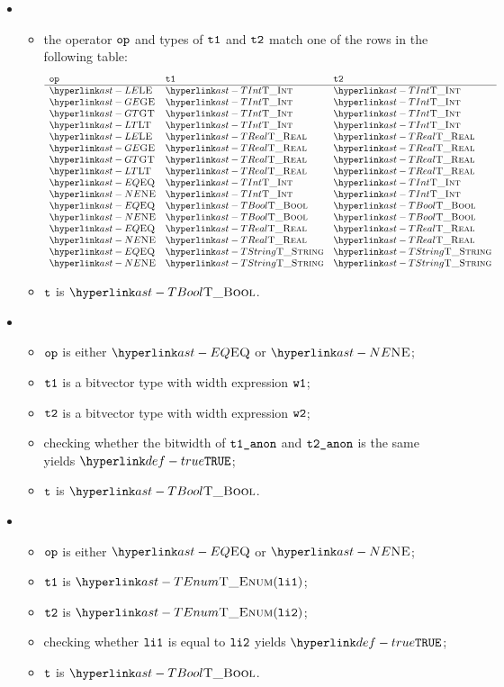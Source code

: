 \begin{itemize}
  \item {}
  \begin{itemize}
    \item the operator $\texttt{op}$ and types of $\texttt{t1}$ and $\texttt{t2}$ match one of the rows in the following table:
    \[
    \begin{array}{lll}
      \mathbf{\op} & \mathbf{\vtone} & \mathbf{\vttwo} \\
      \hline
      \LE  & \TInt    & \TInt\\
      \GE  & \TInt    & \TInt\\
      \GT   & \TInt    & \TInt\\
      \LT   & \TInt    & \TInt\\
      \LE  & \TReal   & \TReal\\
      \GE  & \TReal   & \TReal\\
      \GT   & \TReal   & \TReal\\
      \LT   & \TReal   & \TReal\\
      \EQ & \TInt    & \TInt\\
      \NE  & \TInt    & \TInt\\
      \EQ & \TBool   & \TBool\\
      \NE  & \TBool   & \TBool\\
      \EQ & \TReal   & \TReal\\
      \NE  & \TReal   & \TReal\\
      \EQ & \TString & \TString\\
      \NE  & \TString & \TString
    \end{array}
    \]
    \item $\texttt{t}$ is $\TBool$.
  \end{itemize}

  \item {}
  \begin{itemize}
    \item $\texttt{op}$ is either $\EQ$ or $\NE$;
    \item $\texttt{t1}$ is a bitvector type with width expression $\texttt{w1}$;
    \item $\texttt{t2}$ is a bitvector type with width expression $\texttt{w2}$;
    \item checking whether the bitwidth of $\texttt{t1\_anon}$ and $\texttt{t2\_anon}$ is the same yields $\True$\ProseOrTypeError;
    \item $\texttt{t}$ is $\TBool$.
  \end{itemize}

  \item {}
  \begin{itemize}
    \item $\texttt{op}$ is either $\EQ$ or $\NE$;
    \item $\texttt{t1}$ is $\TEnum(\vlione)$;
    \item $\texttt{t2}$ is $\TEnum(\vlitwo)$;
    \item checking whether $\texttt{li1}$ is equal to $\texttt{li2}$ yields $\True$\ProseOrTypeError;
    \item $\texttt{t}$ is $\TBool$.
  \end{itemize}


\end{itemize}
